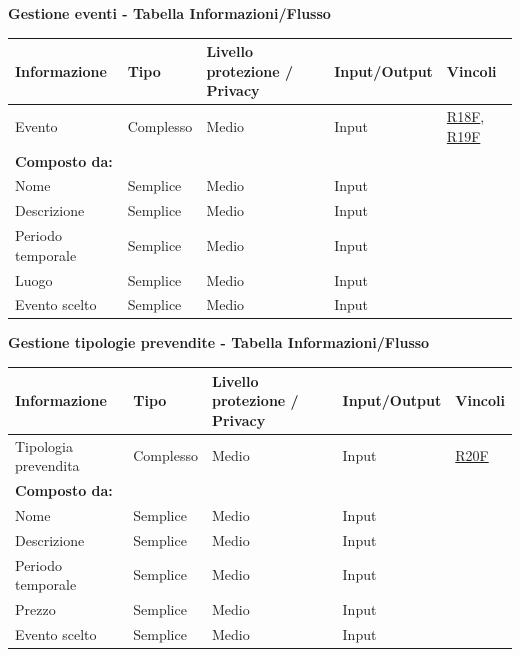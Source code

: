 \documentclass[a4paper]{article}
\begin{document}
\newpage

\textbf{Gestione eventi  - Tabella Informazioni/Flusso}

\begin{center}
    \begin{tabularx}{1\textwidth}{|X|l|X|X|X|}
        \hline
        \textbf{Informazione} &\textbf{Tipo} & \textbf{Livello protezione / Privacy} & \textbf{Input/Output} & \textbf{Vincoli}\\
        \hline
        \hline
        Evento & Complesso & Medio & Input & \hyperlink{R18F}{R18F}, \hyperlink{R19F}{R19F} \\
        \textbf{Composto da:} & & & & \\
        Nome & Semplice & Medio & Input & \\
        Descrizione & Semplice & Medio & Input & \\
        Periodo temporale & Semplice & Medio & Input & \\
        Luogo & Semplice & Medio & Input & \\
        \hline
        Evento scelto & Semplice & Medio & Input & \\
        \hline
    \end{tabularx}
\end{center}

\textbf{Gestione tipologie prevendite  - Tabella Informazioni/Flusso}

\begin{center}
    \begin{tabularx}{1\textwidth}{|X|l|X|X|X|}
        \hline
        \textbf{Informazione} &\textbf{Tipo} & \textbf{Livello protezione / Privacy} & \textbf{Input/Output} & \textbf{Vincoli}\\
        \hline
        \hline
        Tipologia prevendita & Complesso & Medio & Input & \hyperlink{R20F}{R20F} \\
        \textbf{Composto da:} & & & & \\
        Nome & Semplice & Medio & Input & \\
        Descrizione & Semplice & Medio & Input & \\
        Periodo temporale & Semplice & Medio & Input & \\
        Prezzo & Semplice & Medio & Input & \\
        \hline
        Evento scelto & Semplice & Medio & Input & \\
        \hline
    \end{tabularx}
\end{center}
\end{document}
